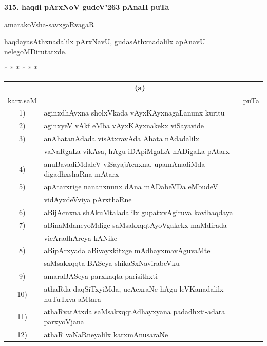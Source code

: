 \medskip
\noindent
\textbf{315. haqdi pArxNoV gudeV\char'263 pAnaH} \hfill {\bf puTa \pageref{page186b}}

\hfill amarakoVsha-savxgaRvagaR

\smallskip
haqdayasAthxnadalilx pArxNavU, gudasAthxnadalilx apAnavU nelegoMDirutatxde.

\begin{center}
* * * * * *
\end{center}



\begin{longtable}{@{}cp{7.4cm}r}
   &      \multicolumn{1}{c}{\textbf{(a)}} & \\[0.5cm]
karx.saM &                                             & puTa\\[0.5cm]
1) & aginxdhAyxna sholxVkada vAyxKAyxnagaLanunx kuritu & \pageref{page208}\\
2) & aginxyeV vAkf eMba vAyxKAyxnakekx viSayavide & \pageref{page211b}\\
3) & anAhatanAdada visAtxravAda Ahata nAdadalilx  & \\
   & vaNaRgaLa vikAsa, hAgu iDApiMgaLA nADigaLa pAtarx & \pageref{page211}\\
4) & anuBavadiMdaleV viSayajAcnxna, upamAnadiMda digadhxshaRna mAtarx & \pageref{page166}\\
5) & apAtarxrige nananxnunx dAna mADabeVDa eMbudeV & \\
   & vidAyxdeVviya pArxthaRne  &  \pageref{page48a}\\
6) & aBijAcnxna shAkuMtaladalilx gupatxvAgiruva kavihaqdaya & \pageref{page234a}\\  
7) & aBinaMdaneyoMdige saMsakxqqtAyoVgakekx maMdirada & \\
   & vicAradhAreya kANike                   & \pageref{page63}\\
8) & aBipArxyada aBivayxkitxge mAdhayxmavAguvaMte & \\
   & saMsakxqqta BASeya shikaSxNavirabeVku & \pageref{page52a}\\
9) & amaraBASeya parxkaqta-parisithxti & \pageref{page25}\\
10) & athaRda daqSiTxyiMda, ucAcxraNe hAgu leVKanadalilx huTuTxva aMtara & \pageref{page180}\\
11) & athaRvatAtxda saMsakxqqtAdhayxyana padadhxti-adara parxyoVjana & \pageref{page4}\\
12) & athaR vaNaRneyalilx karxmAnusaraNe & \pageref{page114}\\

\end{longtable}
